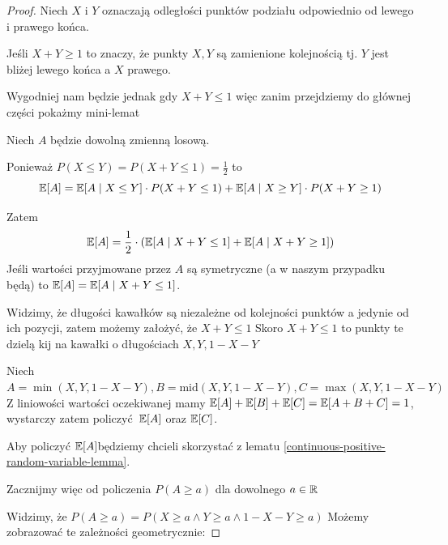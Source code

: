 \begin{proof}
Niech \(X\) i \(Y\) oznaczają odległości punktów podziału odpowiednio od lewego i prawego końca.

Jeśli \(X + Y \geq 1\) to znaczy, że punkty \(X, Y\) są zamienione kolejnością tj. \(Y\) jest bliżej lewego końca a \(X\) prawego.

Wygodniej nam będzie jednak gdy \(X + Y \leq 1\) więc zanim przejdziemy do głównej części pokażmy mini-lemat

Niech \(A\) będzie dowolną zmienną losową.

Ponieważ \(P(X \leq Y) = P(X + Y \leq 1) = \frac{1}{2} \) to 
\[
    \expected{A} =
        \expected{A \mid X \leq Y} \cdot P(X + Y \leq 1) + 
        \expected{A \mid X \geq Y} \cdot P(X + Y \geq 1)
\]

Zatem
\[
    \expected{A} = \frac{1}{2} \cdot \pars{\expected{A \mid X + Y \leq 1} + \expected{A \mid X + Y \geq 1}}
\]
Jeśli wartości przyjmowane przez \(A\) są symetryczne (a w naszym przypadku będą)
to \( \expected{A} = \expected{A \mid X + Y \leq 1} \).


Widzimy, że długości kawałków są niezależne od kolejności punktów a jedynie od ich pozycji, 
zatem możemy założyć, że \(X + Y \leq 1\)
Skoro \(X + Y \leq 1\) to punkty te dzielą kij na kawałki o długościach \(X, Y, 1 - X - Y\)


Niech \(A = \min(X, Y, 1 - X - Y), B = \text{mid}(X, Y, 1 - X - Y), C = \max(X, Y, 1 - X - Y)\)
Z liniowości wartości oczekiwanej mamy \(\expected{A} + \expected{B} + \expected{C} = \expected{A + B + C} = 1\),
wystarczy zatem policzyć \(\expected{A}\) oraz \(\expected{C}\).

Aby policzyć \(\expected{A}\)będziemy chcieli skorzystać z lematu \ref{continuous-positive-random-variable-lemma}.

Zacznijmy więc od policzenia \( P(A \geq a) \) dla dowolnego \(a \in \mathbb{R}\)

Widzimy, że \( P(A \geq a) = P(X \geq a \land Y \geq a \land 1 - X - Y \geq a) \)
Możemy zobrazować te zależności geometrycznie:


\end{proof}

